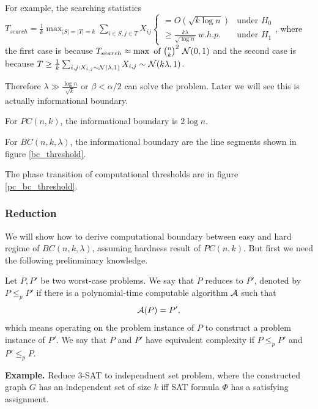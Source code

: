\begin{itemize}
    For example, the searching statistics $T_{search}=\frac{1}{k}\max_{|S|=|T|=k}\sum_{i\in S,j\in T}X_{ij}\begin{cases}
        =O(\sqrt{k\log n}) & \text{under } H_0 \\
        \ge \frac{k\lambda}{\sqrt{\log n}} ~w.h.p.~& \text{under } H_1
    \end{cases}$, where the first case is because $T_{search}\approx\max\text{ of }\binom{n}{k}^2~\mathcal{N}(0,1)$ 
    and the second case is because $T\ge \frac{1}{k}\sum_{i,j:X_{i,j}\sim\mathcal{N}(\lambda,1)}X_{i,j}\sim \mathcal{N}(k\lambda,1)$. 
    
    Therefore $\lambda\gg\frac{\log n}{\sqrt{k}}$ or $\beta<\alpha/2$ can solve the problem. Later we will see this is actually informational boundary.
\end{itemize}

\begin{thm}
    \label{pc_info_threshold}
    For $PC(n,k)$, the informational boundary is $2\log n$.
\end{thm}


\begin{thm}
    \label{bc_info_threshold}
    For $BC(n,k,\lambda)$, the informational boundary are the line segments shown in figure \ref{bc_threshold}.
\end{thm}

\begin{conj}
    The phase transition of computational thresholds are in figure \ref{pc_bc_threshold}.
\end{conj}

\vspace{10pt}

\subsubsection{Reduction}

We will show how to derive computational boundary between easy and hard regime of $BC(n,k,\lambda)$, assuming hardness result of $PC(n,k)$. But first we need the following prelinminary knowledge.
\begin{defn}
Let $P, P'$ be two worst-case problems. We say that $P$ reduces to $P'$, denoted by $P \leq_p P'$ if there is a polynomial-time computable algorithm $\mathcal{A}$ such that
$$
\mathcal{A}(P) = P',
$$
which means operating on the problem instance of $P$ to construct a problem instance of $P'$.
We say that $P$ and $P'$ have equivalent complexity if $P \leq_p P'$ and $P' \leq_p P$.
\end{defn}
\textbf{Example.} Reduce 3-SAT to independnent set problem, where the constructed graph $G$ has an independent set of size $k$ iff SAT formula $\Phi$ has a satisfying assignment. 

